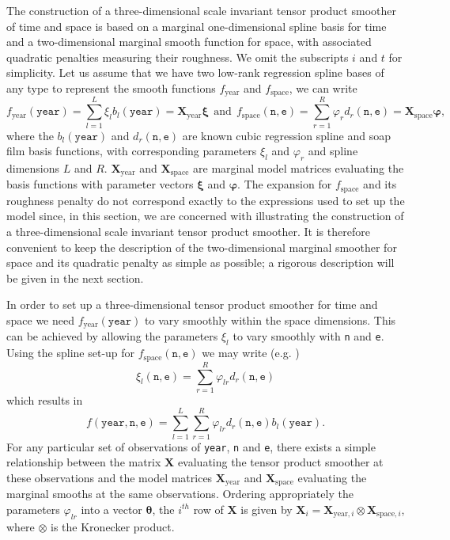 The construction of a three-dimensional scale invariant tensor product smoother of time and space is based on a marginal one-dimensional spline basis for time and a two-dimensional marginal smooth function for space, with associated quadratic penalties measuring their roughness. We omit the subscripts $i$ and $t$ for simplicity. Let us assume that we have two low-rank regression spline bases of any type to represent the smooth functions $f_\text{year}$ and $f_\text{space}$, we can write
$$
f_\text{year}(\texttt{year})=\sum_{l=1}^L \xi_l b_l(\texttt{year})=\textbf{X}_\text{year}\bm\xi \ \ \text{and} \ \ f_\text{space}(\texttt{n},\texttt{e})=\sum_{r=1}^R \varphi_r d_r(\texttt{n},\texttt{e})=\textbf{X}_\text{space}\bm\varphi,
$$
where the $b_l(\texttt{year})$ and $d_r(\texttt{n},\texttt{e})$ are known cubic regression spline and soap film basis functions, with corresponding parameters $\xi_l$ and $\varphi_r$ and spline dimensions $L$ and $R$. $\textbf{X}_\text{year}$ and $\textbf{X}_\text{space}$ are marginal model matrices evaluating the basis functions with parameter vectors $\bm\xi$ and $\bm\varphi$. The expansion for $f_\text{space}$ and its roughness penalty do not correspond exactly to the expressions used to set up the model since, in this section, we are concerned with illustrating the construction of a three-dimensional scale invariant tensor product smoother. It is therefore convenient to keep the description of the two-dimensional marginal smoother for space and its quadratic penalty as simple as possible; a rigorous description will be given in the next section. 

In order to set up a three-dimensional tensor product smoother for time and space we need $f_\text{year}(\texttt{year})$ to vary smoothly within the space dimensions. This can be achieved by allowing the parameters $\xi_l$ to vary smoothly with \texttt{n} and \texttt{e}. Using the spline set-up for $f_\text{space}(\texttt{n},\texttt{e})$ we may write (e.g. \cite[p. 163]{simonbook})
$$
\xi_l(\texttt{n},\texttt{e})=\sum_{r=1}^R \varphi_{lr} d_r(\texttt{n},\texttt{e})
$$    
which results in
$$
f(\texttt{year},\texttt{n},\texttt{e})=\sum_{l=1}^L \sum_{r=1}^R \varphi_{lr} d_r(\texttt{n},\texttt{e}) b_l(\texttt{year}). 
$$
For any particular set of observations of \texttt{year}, \texttt{n} and \texttt{e}, there exists a simple relationship between the matrix $\textbf{X}$ evaluating the tensor product smoother at these observations and the model matrices $\textbf{X}_\text{year}$ and $\textbf{X}_\text{space}$ evaluating the marginal smooths at the same observations. Ordering appropriately the parameters $\varphi_{lr}$ into a vector $\bm\theta$, the $i^{th}$ row of $\textbf{X}$ is given by $\textbf{X}_{i}=\textbf{X}_{\text{year},i}\otimes\textbf{X}_{\text{space},i}$, where $\otimes$ is the Kronecker product. 

